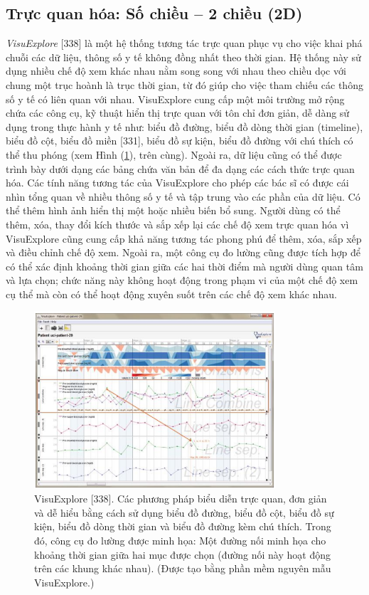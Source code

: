\subsection{Trực quan hóa: Số chiều – 2 chiều (2D)}
\textit{VisuExplore} [338] là một hệ thống tương tác trực quan phục vụ cho việc khai phá chuỗi các dữ liệu, thông số y tế không đồng nhất theo thời gian. Hệ thống này sử dụng nhiều chế độ xem khác nhau nằm song song với nhau theo chiều dọc với chung một trục hoành là trục thời gian, từ đó giúp cho việc tham chiếu các thông số y tế có liên quan với nhau. VisuExplore cung cấp một môi trường mở rộng chứa các công cụ, kỹ thuật hiển thị trực quan với tôn chỉ đơn giản, dễ dàng sử dụng trong thực hành y tế như: biểu đồ đường, biểu đồ dòng thời gian (timeline), biểu đồ cột, biểu đồ miền [331], biểu đồ sự kiện, biểu đồ đường với chú thích có thể thu phóng (xem Hình (\ref{fig:f7.14}), trên cùng). Ngoài ra, dữ liệu cũng có thể được trình bày dưới dạng các bảng chứa văn bản để đa dạng các cách thức trực quan hóa. Các tính năng tương tác của VisuExplore cho phép các bác sĩ có được cái nhìn tổng quan về nhiều thông số y tế và tập trung vào các phần của dữ liệu. Có thể thêm hình ảnh hiển thị một hoặc nhiều biến bổ sung. Người dùng có thể thêm, xóa, thay đổi kích thước và sắp xếp lại các chế độ xem trực quan hóa vì VisuExplore cũng cung cấp khả năng tương tác phong phú để thêm, xóa, sắp xếp và điều chỉnh chế độ xem. Ngoài ra, một công cụ đo lường cũng được tích hợp để có thể xác định khoảng thời gian giữa các hai thời điểm mà người dùng quan tâm và lựa chọn; chức năng này không hoạt động trong phạm vi của một chế độ xem cụ thể mà còn có thể hoạt động xuyên suốt trên các chế độ xem khác nhau.
\begin{figure}[H] %
    \centering %
    \includegraphics[width=0.8\textwidth]{assets/fig_7_14.png} 
    \caption{VisuExplore [338]. Các phương pháp biểu diễn trực quan, đơn giản và dễ hiểu bằng cách sử dụng biểu đồ đường, biểu đồ cột, biểu đồ sự kiện, biểu đồ dòng thời gian và biểu đồ đường kèm chú thích. Trong đó, công cụ đo lường được minh họa: Một đường nối minh họa cho khoảng thời gian giữa hai mục được chọn (đường nối này hoạt động trên các khung khác nhau). (Được tạo bằng phần mềm nguyên mẫu VisuExplore.)} %
    \label{fig:f7.14}
\end{figure}